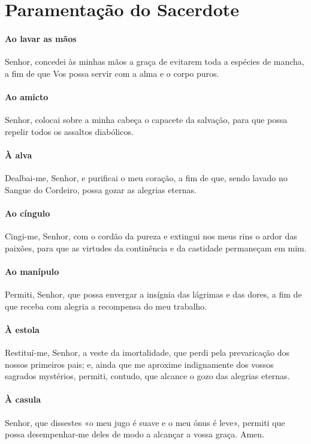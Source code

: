 \section{Paramentação do Sacerdote}

\paragraph{Ao lavar as mãos}

Senhor, concedei às minhas mãos a graça de evitarem toda a espécies de mancha, a fim de que Vos possa servir com a alma e o corpo puros.

\paragraph{Ao amicto}

Senhor, colocai sobre a minha cabeça o capacete da salvação, para que possa repelir todos os assaltos diabólicos.

\paragraph{À alva}

Dealbai-me, Senhor, e purificai o meu coração, a fim de que, sendo lavado no Sangue do Cordeiro, possa gozar as alegrias eternas.

\paragraph{Ao cíngulo}

Cingi-me, Senhor, com o cordão da pureza e extingui nos meus rins o ardor das paixões, para que as virtudes da continência e da castidade permaneçam em mim.

\paragraph{Ao manípulo}

Permiti, Senhor, que possa envergar a insígnia das lágrimas e das dores, a fim de que receba com alegria a recompensa do meu trabalho.

\paragraph{À estola}

Restituí-me, Senhor, a veste da imortalidade, que perdi pela prevaricação dos nossos primeiros pais; e, ainda que me aproxime indignamente dos vossos sagrados mystérios, permiti, contudo, que alcance o gozo das alegrias eternas.

\paragraph{À casula}

Senhor, que dissestes «o meu jugo é suave e o meu ónus é leve», permiti que possa desempenhar-me deles de modo a alcançar a vossa graça. Amen.
